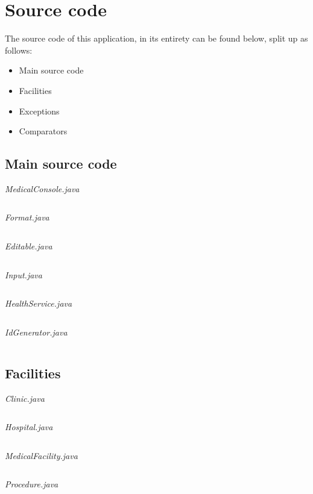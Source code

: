 \documentclass{article}
\begin{document}
	\section{Source code}\label{sec:code} %
	The source code of this application, in its entirety can be found below, split up as follows: 
	\begin{itemize}
		\item Main source code 
		\item Facilities
		\item Exceptions
		\item Comparators
	\end{itemize}

	\subsection{Main source code}\label{sub:main_source_code} %
	\textit{MedicalConsole.java}
	\inputminted{java}{src/main/java/com/yvesstraten/medicalconsole/MedicalConsole.java}

	\textit{Format.java}
	\inputminted{java}{src/main/java/com/yvesstraten/medicalconsole/Format.java}

	\textit{Editable.java}
	\inputminted{java}{src/main/java/com/yvesstraten/medicalconsole/Editable.java}

	\textit{Input.java}
	\inputminted{java}{src/main/java/com/yvesstraten/medicalconsole/Input.java}

	\textit{HealthService.java}
	\inputminted{java}{src/main/java/com/yvesstraten/medicalconsole/HealthService.java}

	\textit{IdGenerator.java}
	\inputminted{java}{src/main/java/com/yvesstraten/medicalconsole/IdGenerator.java}

	\subsection{Facilities}\label{sub:facilities} %
	\textit{Clinic.java}
	\inputminted{java}{src/main/java/com/yvesstraten/medicalconsole/facilities/Clinic.java}

	\textit{Hospital.java}
	\inputminted{java}{src/main/java/com/yvesstraten/medicalconsole/facilities/Hospital.java}

	\textit{MedicalFacility.java}
	\inputminted{java}{src/main/java/com/yvesstraten/medicalconsole/facilities/MedicalFacility.java}

	\textit{Procedure.java}
	\inputminted{java}{src/main/java/com/yvesstraten/medicalconsole/facilities/Procedure.java}
\end{document}
